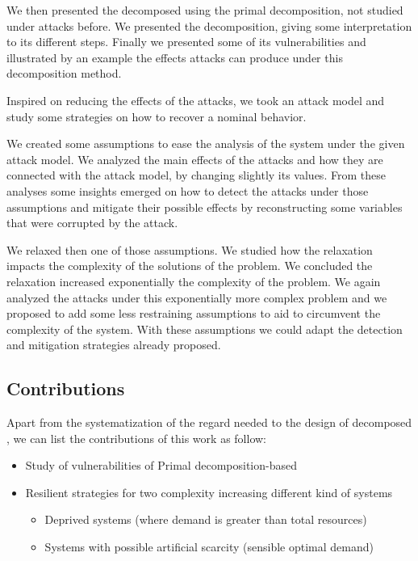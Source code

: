 \documentclass[../main.tex]{subfiles}
\begin{document}
We then presented the \mpc{} decomposed using the primal decomposition, not studied under attacks before.
We presented the decomposition, giving some interpretation to its different steps.
Finally we presented some of its vulnerabilities and illustrated by an example the effects attacks can produce under this decomposition method.

Inspired on reducing the effects of the attacks, we took an attack model and study some strategies on how to recover a nominal behavior.

We created some assumptions to ease the analysis of the system under the given attack model.
We analyzed the main effects of the attacks and how they are connected with the attack model, by changing slightly its values.
From these analyses some insights emerged on how to detect the attacks under those assumptions and mitigate their possible effects by reconstructing some variables that were corrupted by the attack.

We relaxed then one of those assumptions.
We studied how the relaxation impacts the complexity of the solutions of the problem.
We concluded the relaxation increased exponentially the complexity of the problem.
We again analyzed the attacks under this exponentially more complex problem and we proposed to add some less restraining assumptions to aid to circumvent the complexity of the system.
With these assumptions we could adapt the detection and mitigation strategies already proposed.


\subsection{Contributions}
Apart from the systematization of the regard needed to the design of decomposed \cps{}, we can list the contributions of this work as follow:
\begin{itemize}
  \item Study of vulnerabilities of Primal decomposition-based \dmpc{}
  \item Resilient strategies for two complexity increasing different kind of systems
        \begin{itemize}
          \item Deprived systems (where demand is greater than total resources)
          \item Systems with possible artificial scarcity (sensible optimal demand)
        \end{itemize}
\end{itemize}
\end{document}
